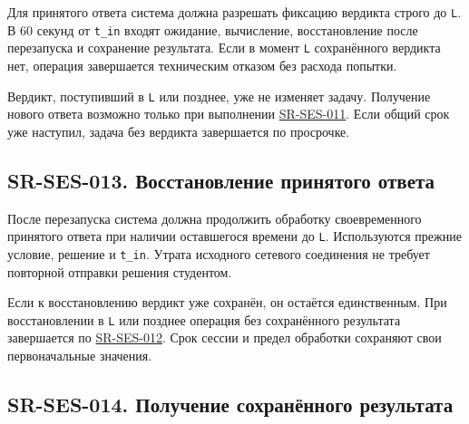 \documentclass[12pt,a4paper]{article}
\begin{document}
\hypertarget{sr-ses-012-ограниченная-длительность-обработки}{}

\hypertarget{sr-ses-012}{}

Для принятого ответа система должна разрешать фиксацию вердикта строго до \texttt{L}. В 60 секунд от \texttt{t\_in} входят ожидание, вычисление, восстановление после перезапуска и сохранение результата. Если в момент \texttt{L} сохранённого вердикта нет, операция завершается техническим отказом без расхода попытки.

Вердикт, поступивший в \texttt{L} или позднее, уже не изменяет задачу. Получение нового ответа возможно только при выполнении {\hyperlink{sr-ses-011}{SR-SES-011}}. Если общий срок уже наступил, задача без вердикта завершается по просрочке.

\subsection{SR-SES-013. Восстановление принятого ответа}\label{sr-ses-013-ux432ux43eux441ux441ux442ux430ux43dux43eux432ux43bux435ux43dux438ux435-ux43fux440ux438ux43dux44fux442ux43eux433ux43e-ux43eux442ux432ux435ux442ux430}

\hypertarget{sr-ses-013-восстановление-принятого-ответа}{}

\hypertarget{sr-ses-013}{}

После перезапуска система должна продолжить обработку своевременного принятого ответа при наличии оставшегося времени до \texttt{L}. Используются прежние условие, решение и \texttt{t\_in}. Утрата исходного сетевого соединения не требует повторной отправки решения студентом.

Если к восстановлению вердикт уже сохранён, он остаётся единственным. При восстановлении в \texttt{L} или позднее операция без сохранённого результата завершается по {\hyperlink{sr-ses-012}{SR-SES-012}}. Срок сессии и предел обработки сохраняют свои первоначальные значения.

\subsection{SR-SES-014. Получение сохранённого результата}\label{sr-ses-014-ux43fux43eux43bux443ux447ux435ux43dux438ux435-ux441ux43eux445ux440ux430ux43dux451ux43dux43dux43eux433ux43e-ux440ux435ux437ux443ux43bux44cux442ux430ux442ux430}

\hypertarget{sr-ses-014-получение-сохранённого-результата}{}

\hypertarget{sr-ses-014}{}
\end{document}
